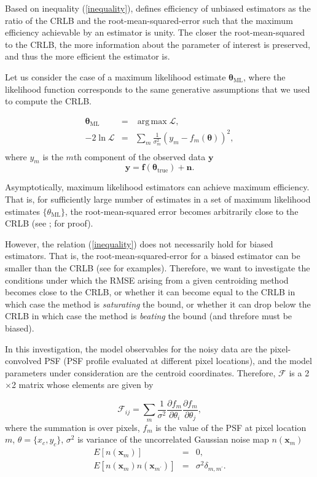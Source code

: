 \documentclass[12pt, preprint]{aastex}
\DeclareMathOperator*{\argmax}{arg\,max}
\newcommand{\beq}{\begin{equation}}
\newcommand{\eeq}{\end{equation}}
\begin{document}
Based on inequality (\ref{inequality}), \citet{cramer} defines efficiency of unbiased 
estimators as the ratio of the CRLB and the root-mean-squared-error such that the maximum efficiency 
achievable by an estimator is unity. The closer the root-mean-squared 
to the CRLB, the more information about the parameter of interest is preserved, and thus the more efficient 
the estimator is. 

Let us consider the case of a maximum likelihood estimate $\boldsymbol{\mathbf{\theta}}_{\text{ML}}$, where the likelihood function corresponds to the same generative assumptions that we used to compute the CRLB.

\begin{eqnarray}
\boldsymbol{\mathbf{\theta}}_{\text{ML}} &=& \argmax \mathcal{L}, \\
-2\ln \mathcal{L} &=& \sum_{m}\frac{1}{\sigma_{m}^{2}}( y_{m} - f_{m}(\boldsymbol{\mathbf{\theta}}))^{2}, \\
\end{eqnarray}
where $y_{m}$ is the $m$th component of the observed data $\mathbf{y}$
\beq
\mathbf{y} = \mathbf{f}(\boldsymbol{\mathbf{\theta}}_{\text{true}}) + \mathbf{n}.
\eeq

Asymptotically, maximum likelihood estimators can achieve maximum efficiency. That is, for sufficiently large 
number of estimates in a set of maximum likelihood estimates $\{\theta_{\text{ML}}\}$, the root-mean-squared 
error becomes arbitrarily close to the CRLB (see \citet{cramer}; \citet{lecam} for proof). 

However, the relation (\ref{inequality}) does not necessarily hold for biased estimators. That is, 
the root-mean-squared-error for a biased estimator can be smaller than the CRLB (see \citet{lecam} for examples).
Therefore, we want to investigate the conditions under which the RMSE arising from a given centroiding method 
becomes close to the CRLB, or whether it can become equal to the CRLB in which case the method is \emph{saturating} 
the bound, or whether it can drop below the CRLB in which case the method is \emph{beating} the bound (and threfore must be biased).   
  
In this investigation, the model observables for the noisy data are the pixel-convolved PSF (PSF profile evaluated at different pixel locations), and  
the model parameters under consideration are the centroid coordinates. Therefore, $\mathcal{F}$
is a 2$\times$2 matrix whose elements are given by

\beq
  \mathcal{F}_{ij} = \sum_{m}\frac{1}{\sigma^{2}}
                \frac{\partial f_{m}}{\partial \theta_{i}}\frac{\partial f_{m}}{\partial \theta_{j}},
\label{fish}
\eeq
where the summation is over pixels, $f_{m}$ is the value of the PSF at pixel location $m$,
$\theta=\{x_{c},y_{c}\}$, $\sigma^{2}$ is variance of the uncorrelated Gaussian noise map $n(\mathbf{x}_{m})$
\begin{eqnarray}
E[n(\mathbf{x}_{m})] &=& 0, \\
E[n(\mathbf{x}_{m})n(\mathbf{x}_{m^{\prime}})] &=& \sigma^{2}\delta_{m,m^{\prime}}. 
\end{eqnarray}
\end{document}
